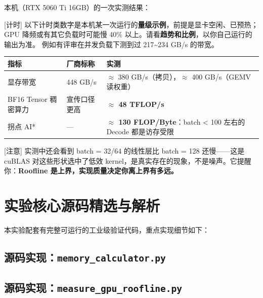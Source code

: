 本机（RTX 5060 Ti 16GB）的一次实测结果：

\begin{noteBox}[核心导读与背景]
{}[计时] 以下计时类数字是本机某一次运行的\textbf{量级示例}，前提是显卡空闲、已预热；GPU 降频或有其它负载时可能慢 40\% 以上。请看\textbf{趋势和比例}，以你自己运行的输出为准。 例如有评审在并发负载下测到过 217\textasciitilde{}234 GB/s 的带宽。
\end{noteBox}

\begin{center}
\small
\begin{tabularx}{\textwidth}{p{3cm} p{4.5cm} X}
\toprule
\textbf{指标} & \textbf{厂商标称} & \textbf{实测} \\
\midrule
显存带宽 & 448 GB/s & $\approx$ 380 GB/s（拷贝），$\approx$ 400 GB/s（GEMV 读权重） \\
BF16 Tensor 稠密算力 & 宣传口径更高 & \textbf{$\approx$ 48 TFLOP/s} \\
拐点 AI* & — & \textbf{$\approx$ 130 FLOP/Byte}：batch < 100 左右的 Decode 都是访存受限 \\
\bottomrule
\end{tabularx}
\end{center}

\begin{warningBox}[避坑指南与核心警示]
{}[注意] 实测中还会看到 batch = 32/64 的线性层比 batch = 128 还慢——这是 cuBLAS 对这些形状选中了低效 kernel，是真实存在的现象，不是噪声。它提醒你：\textbf{Roofline 是上界，实现质量决定你离上界有多远。}
\end{warningBox}



\section{实验核心源码精选与解析}

本实验配套有完整可运行的工业级验证代码，重点实现细节如下：


\subsection{源码实现：\texttt{memory\_calculator.py}}




\subsection{源码实现：\texttt{measure\_gpu\_roofline.py}}



